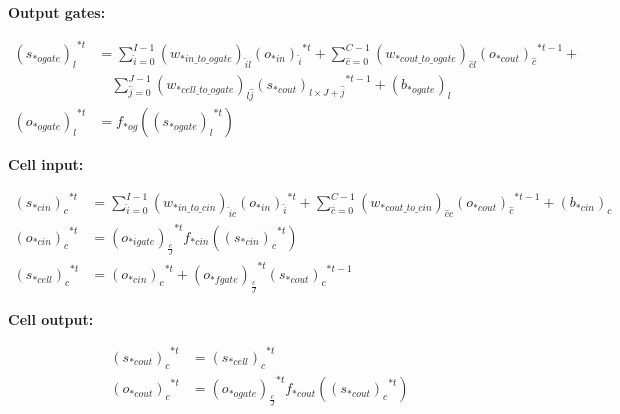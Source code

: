 \documentclass[runningheads,openany]{xhlPaper}
\begin{document}
\textbf{Output gates:}

\begin{equation}
\label{equ:rnn_lstm_forward_output_gate}
\begin{aligned}
{\left( {{s_{*ogate}}} \right)_l}^{*t} &= \sum\limits_{\hat i = 0}^{I - 1} {{{\left( {{w_{*in\_to\_ogate}}} \right)}_{\hat il}}{{\left( {{o_{*in}}} \right)}_{\hat i}}^{*t}}  + \sum\limits_{\hat c = 0}^{C - 1} {{{\left( {{w_{*cout\_to\_ogate}}} \right)}_{\hat cl}}{{\left( {{o_{*cout}}} \right)}_{\hat c}}^{*t - 1}}  + \\
&\quad\sum\limits_{\hat j = 0}^{J - 1} {{{\left( {{w_{*cell\_to\_ogate}}} \right)}_{l\hat j}}{{\left( {{s_{*cout}}} \right)}_{l \times J + \hat j}}^{*t - 1}}  + {\left( {{b_{*ogate}}} \right)_l}\\
{\left( {{o_{*ogate}}} \right)_l}^{*t} &= {f_{*og}}\left( {{{\left( {{s_{*ogate}}} \right)}_l}^{*t}} \right)
\end{aligned}
\end{equation}

\textbf{Cell input:}

\begin{equation}
\label{equ:rnn_lstm_forward_cell_input}
\begin{aligned}
{\left( {{s_{*cin}}} \right)_c}^{*t} &= \sum\limits_{\hat i = 0}^{I - 1} {{{\left( {{w_{*in\_to\_cin}}} \right)}_{\hat ic}}{{\left( {{o_{*in}}} \right)}_{\hat i}}^{*t}}  + \sum\limits_{\hat c = 0}^{C - 1} {{{\left( {{w_{*cout\_to\_cin}}} \right)}_{\hat cc}}{{\left( {{o_{*cout}}} \right)}_{\hat c}}^{*t - 1}}  + {\left( {{b_{*cin}}} \right)_c}\\
{\left( {{o_{*cin}}} \right)_c}^{*t} &= {\left( {{o_{*igate}}} \right)_{\frac{c}{J}}}^{*t}{f_{*cin}}\left( {{{\left( {{s_{*cin}}} \right)}_c}^{*t}} \right)\\
{\left( {{s_{*cell}}} \right)_c}^{*t} &= {\left( {{o_{*cin}}} \right)_c}^{*t} + {\left( {{o_{*fgate}}} \right)_{\frac{c}{J}}}^{*t}{\left( {{s_{*cout}}} \right)_c}^{*t - 1}
\end{aligned}
\end{equation}

\textbf{Cell output:}

\begin{equation}
\label{equ:rnn_lstm_forward_cell_output}
\begin{aligned}
{\left( {{s_{*cout}}} \right)_c}^{*t} &= {\left( {{s_{*cell}}} \right)_c}^{*t}\\
{\left( {{o_{*cout}}} \right)_c}^{*t} &= {\left( {{o_{*ogate}}} \right)_{\frac{c}{J}}}^{*t}{f_{*cout}}\left( {{{\left( {{s_{*cout}}} \right)}_c}^{*t}} \right)
\end{aligned}
\end{equation}
\end{document}
